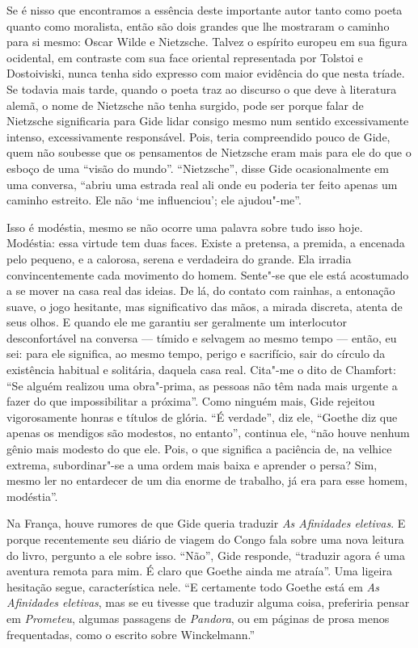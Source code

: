 Se é nisso que encontramos a essência deste importante autor tanto como
poeta quanto como moralista, então são dois grandes que lhe mostraram o
caminho para si mesmo: Oscar Wilde e Nietzsche. Talvez o espírito
europeu em sua figura ocidental, em contraste com sua face oriental
representada por Tolstoi e Dostoiviski, nunca tenha sido expresso com
maior evidência do que nesta tríade. Se todavia mais tarde, quando o
poeta traz ao discurso o que deve à literatura alemã, o nome de
Nietzsche não tenha surgido, pode ser porque falar de Nietzsche
significaria para Gide lidar consigo mesmo num sentido excessivamente
intenso, excessivamente responsável. Pois, teria compreendido pouco de
Gide, quem não soubesse que os pensamentos de Nietzsche eram mais para
ele do que o esboço de uma ``visão do mundo''. ``Nietzsche'', disse Gide
ocasionalmente em uma conversa, ``abriu uma estrada real ali onde eu
poderia ter feito apenas um caminho estreito. Ele não `me influenciou';
ele ajudou"-me''.

Isso é modéstia, mesmo se não ocorre uma palavra sobre tudo isso hoje.
Modéstia: essa virtude tem duas faces. Existe a pretensa, a premida, a
encenada pelo pequeno, e a calorosa, serena e verdadeira do grande. Ela
irradia convincentemente cada movimento do homem. Sente"-se que ele está
acostumado a se mover na casa real das ideias. De lá, do contato com
rainhas, a entonação suave, o jogo hesitante, mas significativo das
mãos, a mirada discreta, atenta de seus olhos. E quando ele me garantiu
ser geralmente um interlocutor desconfortável na conversa --- tímido e
selvagem ao mesmo tempo --- então, eu sei: para ele significa, ao mesmo
tempo, perigo e sacrifício, sair do círculo da existência habitual e
solitária, daquela casa real. Cita"-me o dito de Chamfort: ``Se alguém
realizou uma obra"-prima, as pessoas não têm nada mais urgente a fazer do
que impossibilitar a próxima''. Como ninguém mais, Gide rejeitou
vigorosamente honras e títulos de glória. ``É verdade'', diz ele,
``Goethe diz que apenas os mendigos são modestos, no entanto'', continua
ele, ``não houve nenhum gênio mais modesto do que ele. Pois, o que
significa a paciência de, na velhice extrema, subordinar"-se a uma ordem
mais baixa e aprender o persa? Sim, mesmo ler no entardecer de um dia
enorme de trabalho, já era para esse homem, modéstia''.

Na França, houve rumores de que Gide queria traduzir \emph{As Afinidades
eletivas}. E porque recentemente seu diário de viagem do Congo fala
sobre uma nova leitura do livro, pergunto a ele sobre isso. ``Não'',
Gide responde, ``traduzir agora é uma aventura remota para mim. É claro
que Goethe ainda me atraía''. Uma ligeira hesitação segue, característica
nele. ``E certamente todo Goethe está em \emph{As} \emph{Afinidades
eletivas}, mas se eu tivesse que traduzir alguma coisa, preferiria
pensar em \emph{Prometeu}, algumas passagens de \emph{Pandora}, ou em
páginas de prosa menos frequentadas, como o escrito sobre Winckelmann.''

